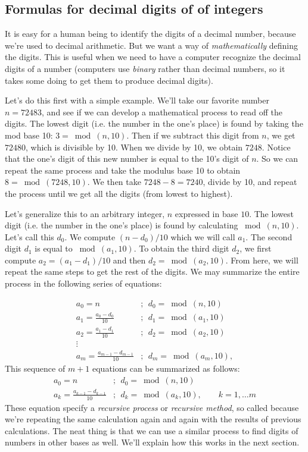 \subsection{Formulas for decimal digits of of integers}\label{decDigits}
It is easy for a human being to identify the digits of a decimal number, because we're used to decimal arithmetic. But we want a way of \emph{mathematically} defining the digits.  This is useful when we need to have a computer recognize the decimal digits of a number (computers use  \emph{binary} rather than decimal numbers, so it takes some doing to get them to produce decimal digits). 

Let's do this first with a simple example. We'll take our favorite number $n=72483$, and see if we can develop a mathematical process to read off the digits.  The lowest digit (i.e. the number in the  one's place) is found by taking the mod base 10:  $3 = \bmod (n,10)$. Then if we subtract this digit from $n$, we get $72480$, which is divisible by 10. When we divide by 10, we obtain $7248$. Notice that the one's digit of this new number is equal to the 10's digit of $n$. So we can repeat the same process and take the modulus base 10 to obtain $8 = \bmod(7248,10)$.  We then take $7248 - 8 = 7240$, divide by 10, and repeat the process until we get all the digits (from lowest to highest).  

Let's generalize this to an arbitrary integer, $n$ expressed in base $10$. The lowest digit (i.e. the number in the  one's place) is found by calculating $\bmod (n,10)$. Let's call this $d_0$. We compute $(n-d_0)/10$ which we will call $a_1$. The second digit $d_1$ is equal to $\bmod(a_1,10)$. To obtain the third digit $d_2$, we first compute $a_2  = (a_1-d_1)/10$  and then $d_2 = \bmod(a_2,10)$. From here, we will repeat the same steps to get the rest of the digits.  We may summarize the entire process in the following series of equations:

\begin{align*}
a_{0}=n&;~~ d_{0}=\bmod(n,10)\\
a_{1}=\frac{a_{0}-d_{0}}{10}&;~~ d_{1}=\bmod(a_{1},10)\\
a_{2}=\frac{a_{1}-d_{1}}{10}&;~~ d_{2}=\bmod(a_{2},10)\\
\vdots \\
a_{m}=\frac{a_{m-1}-d_{m-1}}{10}&;~~ d_{m}=\bmod(a_{m},10),
\end{align*}
This sequence of $m+1$ equations can be summarized as follows:
\begin{align*}
a_{0}=n&;~~ d_{0}=\bmod(n,10)\\
a_{k}=\frac{a_{k-1}-d_{k-1}}{10}&;~~ d_{k}=\bmod(a_{k},10), \qquad k = 1, \ldots m
\end{align*}
These equation specify a  \emph{recursive process} or \emph{recursive method}, so called  because we're repeating the same calculation again and again with the results of previous calculations. 
The neat thing is that we can use a similar  process  to find digits of numbers in other bases as well. We'll explain how this works in the next section.\\

